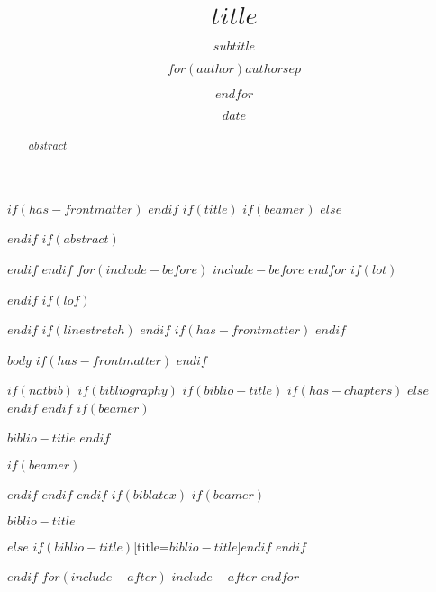 \documentclass[11pt,a4paper,xelatex,ja=standard]{bxjsarticle}
\title{$title$}
\subtitle{$subtitle$}
\author{$for(author)$$author$$sep$ \and $endfor$}
\date{$date$}
\institute{$for(institute)$$institute$$sep$ \and $endfor$}
\newif\ifbibliography
\begin{document}
\pagestyle{empty}
$if(has-frontmatter)$
\frontmatter
$endif$
$if(title)$
$if(beamer)$
\frame{\titlepage}
$else$
\maketitle
$endif$
$if(abstract)$
\begin{abstract}
$abstract$
\end{abstract}
$endif$
$endif$
$for(include-before)$
$include-before$
$endfor$
$if(lot)$
\listoftables
$endif$
$if(lof)$
\listoffigures
$endif$
$if(linestretch)$
$endif$
$if(has-frontmatter)$
\mainmatter
$endif$
\pagestyle{plain}
\setcounter{page}{1}

$body$
$if(has-frontmatter)$
\backmatter
$endif$

$if(natbib)$
$if(bibliography)$
$if(biblio-title)$
$if(has-chapters)$
\renewcommand\bibname{$biblio-title$}
$else$
\renewcommand\refname{$biblio-title$}
$endif$
$endif$
$if(beamer)$
\begin{frame}[allowframebreaks]{$biblio-title$}
  \bibliographytrue
$endif$
  
$if(beamer)$
\end{frame}
$endif$
$endif$
$endif$
$if(biblatex)$
$if(beamer)$
\begin{frame}[allowframebreaks]{$biblio-title$}
  \bibliographytrue
  \printbibliography[heading=none]
\end{frame}
$else$
\printbibliography$if(biblio-title)$[title=$biblio-title$]$endif$
$endif$

$endif$
$for(include-after)$
$include-after$
$endfor$
\end{document}
